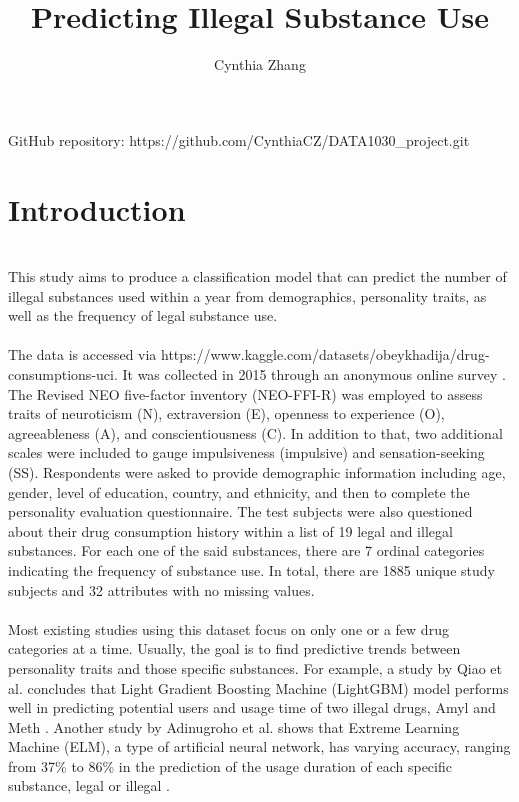 \documentclass[12pt]{article}
\begin{document}
	\title{Predicting Illegal Substance Use}
	\author{Cynthia Zhang}
	\maketitle

 \begin{center}
     GitHub repository: https://github.com/CynthiaCZ/DATA1030\_project.git
 \end{center}
\section{Introduction}\\
This study aims to produce a classification model that can predict the number of illegal substances used within a year from demographics, personality traits, as well as the frequency of legal substance use. \\
\\
The data is accessed via https://www.kaggle.com/datasets/obeykhadija/drug-consumptions-uci. It was collected in 2015 through an anonymous online survey \cite{fehrman_muhammad_mirkes_egan_gorban_2017}. The Revised NEO five-factor inventory (NEO-FFI-R) was employed to assess traits of neuroticism (N), extraversion (E), openness to experience (O), agreeableness (A), and conscientiousness (C). In addition to that, two additional scales were included to gauge impulsiveness (impulsive) and sensation-seeking (SS). Respondents were asked to provide demographic information including age, gender, level of education, country, and ethnicity, and then to complete the personality evaluation questionnaire. The test subjects were also questioned about their drug consumption history within a list of 19 legal and illegal substances. For each one of the said substances, there are 7 ordinal categories indicating the frequency of substance use. In total, there are 1885 unique study subjects and 32 attributes with no missing values.\\
\\
Most existing studies using this dataset focus on only one or a few drug categories at a time. Usually, the goal is to find predictive trends between personality traits and those specific substances. For example, a study by Qiao et al. concludes that Light Gradient Boosting Machine (LightGBM) model performs well in predicting potential users and usage time of two illegal drugs, Amyl and Meth \cite{qiao_chai_zhang_zhou_chu_2019}. Another study by Adinugroho et al. shows that Extreme Learning Machine (ELM), a type of artificial neural network, has varying accuracy, ranging from 37\% to 86\% in the prediction of the usage duration of each specific substance, legal or illegal \cite{adinugroho_sari_hidayat_2019}. \\
\end{document}
